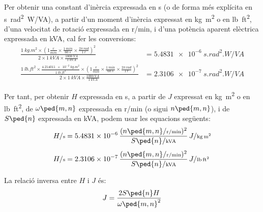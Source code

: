Per  obtenir una constant d'inèrcia  expressada en \unit{s} (o de forma més explícita en \unit{s.rad^2.W/VA}), a partir d'un moment d'inèrcia expressat en \unit{kg.m^2} o en \unit{lb.ft^2}, d'una velocitat de rotació expressada en \unit{r/min}, i d'una potència aparent elèctrica expressada en \unit{kVA}, cal  fer les conversions:
\begin{subequations}
\begin{align}
    \frac{\qty{1}{kg.m^2} \times \left(1\frac{\unit{r}}{\unit{min}} \times \frac{\qty{1}{min}}{\qty{60}{s}} \times \frac{2\pi\,\unit{rad}}{\qty{1}{r}}\right)^2}{2\times \qty{1}{kVA} \times \frac{\qty{1000}{VA}}{\qty{1}{kVA}}}  &= \qty{5,4831e-6}{s.rad^2.W/VA} \\[1ex]
   \frac{\qty{1}{lb.ft^2} \times \frac{\qty{4,214011e-2}{kg.m^2}}{\qty{1}{lb.ft^2}} \times \left(1\frac{\unit{r}}{\unit{min}} \times \frac{\qty{1}{min}}{\qty{60}{s}} \times \frac{2\pi\,\unit{rad}}{\qty{1}{r}}\right)^2}{2\times \qty{1}{kVA}  \times
   \frac{\qty{1000}{VA}}{\qty{1}{kVA}}} &= \qty{2,3106e-7}{s.rad^2.W/VA}
\end{align}
\end{subequations}

Per tant, per  obtenir $H$ expressada en \unit{s}, a partir de $J$  expressat en \unit{kg.m^2} o en \unit{lb.ft^2}, de $\omega\ped{m,n}$ expressada en \unit{r/min} (o sigui $n\ped{m,n}$), i de $S\ped{n}$ expressada en \unit{kVA}, podem usar les equacions següents:
\begin{subequations}
\begin{align}
    H/{\scriptstyle \unit{s}} &= \num{5,4831e-6}\,  \frac{(n\ped{m,n}/{\scriptstyle \unit{r/min}})^2}{S\ped{n}/{\scriptstyle \unit{kVA}}} \, J/{\scriptstyle \unit{kg.m^2}} \\[1ex]
    H/{\scriptstyle \unit{s}} &= \num{2,3106e-7}\,  \frac{(n\ped{m,n}/{\scriptstyle \unit{r/min}})^2}{S\ped{n}/{\scriptstyle \unit{kVA}}} \, J/{\scriptstyle \unit{lb.ft^2}}
\end{align}
\end{subequations}

La relació inversa entre $H$ i $J$ és:
\begin{equation}
    J = \frac{2 S\ped{n} H}{\omega\ped{m,n}^2}
\end{equation}


